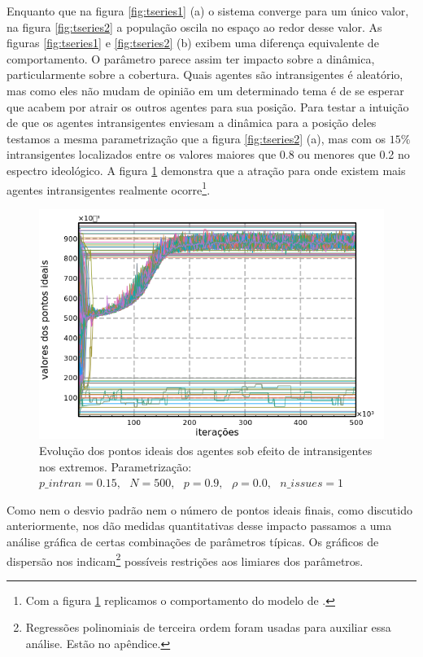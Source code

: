     Enquanto que na figura \ref{fig:tseries1} (a) o sistema converge para um
    único valor, na figura \ref{fig:tseries2} a população oscila no espaço ao
    redor desse valor. As figuras \ref{fig:tseries1} e \ref{fig:tseries2} (b)
    exibem uma diferença equivalente de comportamento. O parâmetro parece assim
    ter impacto sobre a dinâmica, particularmente sobre a cobertura. Quais
    agentes são intransigentes é aleatório, mas como eles não mudam de opinião
    em um determinado tema é de se esperar que acabem por atrair os outros
    agentes para sua posição. Para testar a intuição de que os agentes
    intransigentes enviesam a dinâmica para a posição deles testamos a mesma
    parametrização que a figura \ref{fig:tseries2} (a), mas com os \(15\%\)
    intransigentes localizados entre os valores maiores que 0.8 ou menores que
    0.2 no espectro ideológico. A figura \ref{fig:tseries3} demonstra que a
    atração para onde existem mais agentes intransigentes realmente
    ocorre\footnote{Com a figura \ref{fig:tseries3} replicamos o comportamento
      do modelo de .}.

      \begin{figure}[H]
    \centering
    \includegraphics[scale=0.7]{ims/sigma01extremes.png}
    \caption{ Evolução dos pontos ideais dos agentes sob efeito de
      intransigentes nos extremos. Parametrização: \(p\_intran = 0.15, \text{ }
      N = 500, \text{ } p = 0.9, \text{ } \rho = 0.0, \text{ } n\_issues = 1 \)}
    \label{fig:tseries3}
  \end{figure}
  

    Como nem o desvio padrão nem o número de pontos ideais finais,
    como discutido anteriormente, nos dão medidas quantitativas desse impacto
    passamos a uma análise gráfica de certas combinações de parâmetros típicas.
    Os gráficos de dispersão nos indicam\footnote{Regressões polinomiais de
      terceira ordem foram usadas para auxiliar essa análise. Estão no
      apêndice.} possíveis restrições aos limiares dos parâmetros.

